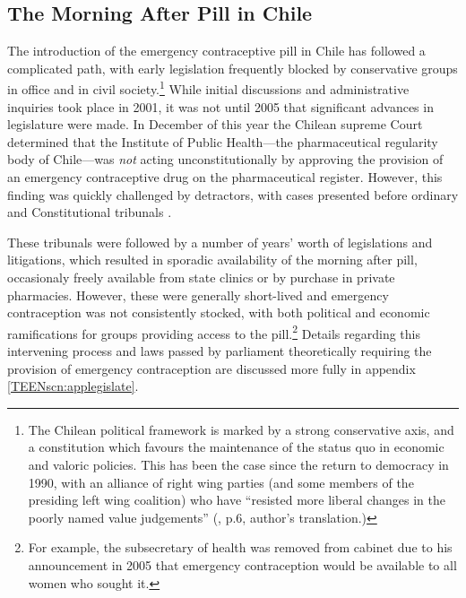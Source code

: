 \subsection{The Morning After Pill in Chile}
\label{TEENsscn:Chile}
The introduction of the emergency contraceptive pill in Chile has followed 
a complicated path, with early legislation frequently blocked by conservative 
groups in office and in civil society.\footnote{The Chilean political 
framework is marked by a strong conservative axis, and a constitution which 
favours the maintenance of the status quo in economic and valoric policies.  
This has been the case since the return to democracy in 1990, with an 
alliance of right wing parties (and some members of the presiding left wing 
coalition) who have ``resisted more liberal changes in the poorly named value 
judgements''  (\citet{CasasBecerra2008}, p.6, author's translation.)}  While 
initial discussions and administrative inquiries took place in 2001, it was 
not until 2005 that significant advances in legislature were made. In 
December of this year the Chilean supreme Court determined that the Institute 
of Public Health---the pharmaceutical regularity body of Chile---was 
\emph{not} acting unconstitutionally by approving the provision of an 
emergency contraceptive drug on the pharmaceutical register.  However, this 
finding was quickly challenged by detractors, with cases presented before 
ordinary and Constitutional tribunals \citep{CasasBecerra2008}.

These tribunals were followed by a number of years' worth of legislations and
litigations, which resulted in sporadic availability of the morning
after pill, occasionaly freely available from state clinics or by purchase in
private pharmacies.  However, these were generally short-lived and emergency
contraception was not consistently stocked, with both political and economic 
ramifications for groups providing access to the pill.\footnote{For example,
the subsecretary of health was removed from cabinet due to his announcement
in 2005 that emergency contraception would be available to all women who sought
it.}  Details regarding this intervening process and laws passed by parliament
theoretically requiring the provision of emergency contraception are discussed 
more fully in appendix \ref{TEENscn:applegislate}.

